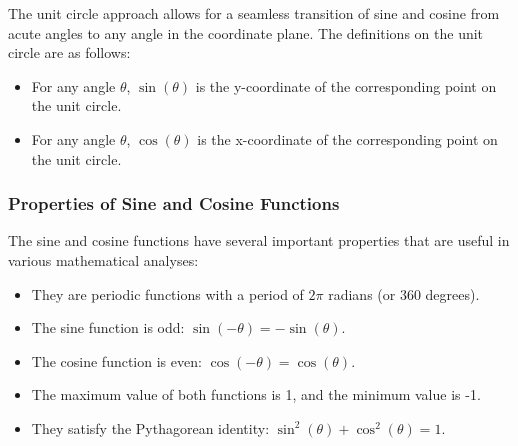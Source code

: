 \documentclass[a4paper,12pt]{book}
\begin{document}
\begin{center}
\end{center}

The unit circle approach allows for a seamless transition of sine and cosine from acute angles to any angle in the coordinate plane. The definitions on the unit circle are as follows:

\begin{itemize}
    \item For any angle \( \theta \), \( \sin(\theta) \) is the y-coordinate of the corresponding point on the unit circle.
    \item For any angle \( \theta \), \( \cos(\theta) \) is the x-coordinate of the corresponding point on the unit circle.
\end{itemize}


\subsubsection*{Properties of Sine and Cosine Functions}

The sine and cosine functions have several important properties that are useful in various mathematical analyses:

\begin{itemize}
    \item They are periodic functions with a period of \( 2\pi \) radians (or 360 degrees).
    \item The sine function is odd: \( \sin(-\theta) = -\sin(\theta) \).
    \item The cosine function is even: \( \cos(-\theta) = \cos(\theta) \).
    \item The maximum value of both functions is 1, and the minimum value is -1.
    \item They satisfy the Pythagorean identity: \( \sin^2(\theta) + \cos^2(\theta) = 1 \).
\end{itemize}
\end{document}
